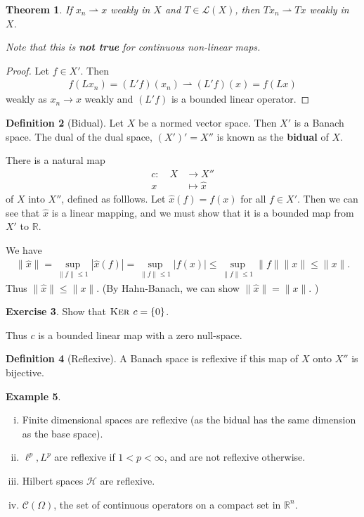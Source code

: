 \documentclass[10pt, oneside, reqno]{amsart}
\theoremstyle{plain}%
\newtheorem{thm}{Theorem}[section]
\numberwithin{equation}{section}
\theoremstyle{definition}
\newtheorem{defn}[thm]{Definition}
\newtheorem{exmp}[thm]{Example}
\newtheorem{exer}[thm]{Exercise}
\theoremstyle{remark}
\newcommand{\R}{\mathbb{R}}
\newcommand{\El}{\mathcal{L}}
\newcommand{\mapping}[5]{\begin{align*}
    #1 : \quad     #2 &\rightarrow #3 \\
            #4  &\mapsto #5
\end{align*}    
}
\renewcommand{\ker}{\textsc{Ker\ }}
\begin{document}
\begin{thm}
    If $x_n \rightharpoonup x$ weakly in $X$ and $T \in \El(X)$, then $Tx_n \rightharpoonup Tx$ weakly in $X$.  
    
    Note that this is \textbf{not true} for continuous non-linear maps. 
\end{thm}
\begin{proof}
    Let $f \in X'$.  Then \begin{align*}
        f(Lx_n) = (L'f)(x_n) \rightharpoonup (L'f)(x) = f(Lx)
    \end{align*} weakly as $x_n \rightarrow x$ weakly and $(L'f)$ is a bounded linear operator.  
\end{proof}


\begin{defn}[Bidual]
    Let $X$ be a normed vector space. Then $X'$ is a Banach space.  The dual of the dual space, $(X')' = X''$ is known as the \textbf{bidual} of $X$.  
\end{defn}


There is a natural map \mapping{c}{X}{X''}{x}{\hat x} of $X$ into $X''$, defined as folllows.  Let $\hat x(f) = f(x)$ for all $f \in X'$.  Then we can see that $\hat x$ is a linear mapping, and we must show that it is a bounded map from $X'$ to $\R$.  

We have \begin{align*}
    \| \hat x \| = \sup_{\| f \| \leq 1} |\hat x(f)| = \sup_{\| f \| \leq 1} |f(x)| \leq \sup_{\|f \| \leq 1} \| f \| \| x \| \leq \| x \|. 
\end{align*}  Thus $\| \hat x \| \leq \| x \|$.  (By Hahn-Banach, we can show $\| \hat x \| = \| x \|$. )

\begin{exer}
    Show that $\ker c = \{ 0 \}$.  
\end{exer}  

Thus $c$ is a bounded linear map with a zero null-space.

\begin{defn}[Reflexive]
    A Banach space is reflexive if this map of $X$ onto $X''$ is bijective.  
\end{defn}

\begin{exmp}{\ }
    \begin{enumerate}[(i)]
        \item Finite dimensional spaces are reflexive (as the bidual has the same dimension as the base space).
        \item $\ell^p, L^p$ are reflexive if $1 < p < \infty$, and are not reflexive otherwise.
        \item Hilbert spaces $\mathcal H$ are reflexive.
        \item $\mathcal C(\Omega)$, the set of continuous operators on a compact set in $\R^n$.  
    \end{enumerate}
\end{exmp}
\end{document}
